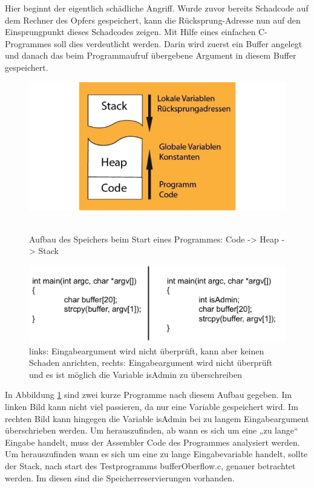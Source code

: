 Hier beginnt der eigentlich schädliche Angriff. Wurde zuvor bereits Schadcode auf dem Rechner des Opfers gespeichert, kann die Rücksprung-Adresse nun auf den Einsprungpunkt dieses Schadcodes zeigen. Mit Hilfe eines einfachen C-Programmes soll dies verdeutlicht werden. Darin wird zuerst ein Buffer angelegt und danach das beim Programmaufruf übergebene Argument in diesem Buffer gespeichert.
    \begin{figure}[H]
		\centering
		\includegraphics[width=1.0\textwidth]{images/bufferPics/speicherAufbau.jpg}
        \
		\caption{Aufbau des Speichers beim Start eines Programmes: Code -> Heap ->
Stack}
	\end{figure}
   		\label{fig:speicherAufbau}
        \begin{figure}[H]
		\centering
		\includegraphics[width=1.0\textwidth]{images/bufferPics/beispielCode.png}        
		\caption{links: Eingabeargument wird nicht überprüft, kann aber keinen Schaden anrichten, rechts: Eingabeargument wird nicht überprüft und es ist möglich die Variable isAdmin zu überschreiben}
\label{fig:buffer1}
	\end{figure}
In Abbildung \ref{fig:buffer1} sind zwei kurze Programme nach diesem Aufbau gegeben.
Im linken Bild kann nicht viel passieren, da nur eine Variable gespeichert wird. Im
rechten Bild kann hingegen die Variable isAdmin bei zu langem Eingabeargument
überschrieben werden.
Um herauszufinden, ab wann es sich um eine „zu lange“ Eingabe handelt, muss
der Assembler Code des Programmes analysiert werden. Um herauszufinden wann es sich um eine zu lange Eingabevariable handelt, sollte der Stack, nach start des Testprogramms bufferOberflow.c, genauer betrachtet werden. Im diesen sind die Speicherreservierungen vorhanden. 
